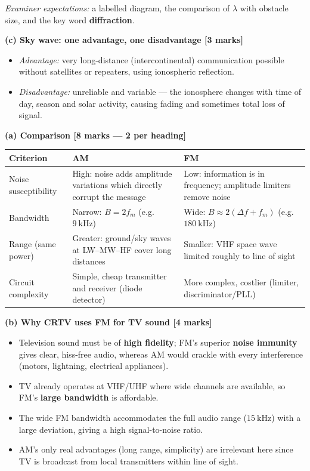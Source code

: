 \documentclass[11pt]{article}
\begin{document}
\begin{corrige}
\emph{Examiner expectations:} a labelled diagram, the comparison of $\lambda$ with obstacle size, and the key word \textbf{diffraction}.

\textbf{(c) Sky wave: one advantage, one disadvantage [3 marks]}
\begin{itemize}
\item \emph{Advantage:} very long-distance (intercontinental) communication possible without satellites or repeaters, using ionospheric reflection.
\item \emph{Disadvantage:} unreliable and variable — the ionosphere changes with time of day, season and solar activity, causing fading and sometimes total loss of signal.
\end{itemize}
\end{corrige}

\begin{corrige}
\textbf{(a) Comparison [8 marks — 2 per heading]}

\begin{center}
\begin{tabularx}{\linewidth}{|l|X|X|}
\hline
\rowcolor{popblueL} \textbf{Criterion} & \textbf{AM} & \textbf{FM} \\
\hline
Noise susceptibility & High: noise adds amplitude variations which directly corrupt the message & Low: information is in frequency; amplitude limiters remove noise \\
\hline
Bandwidth & Narrow: $B = 2f_m$ (e.g. $9\ \mathrm{kHz}$) & Wide: $B \approx 2(\Delta f + f_m)$ (e.g. $180\ \mathrm{kHz}$) \\
\hline
Range (same power) & Greater: ground/sky waves at LW--MW--HF cover long distances & Smaller: VHF space wave limited roughly to line of sight \\
\hline
Circuit complexity & Simple, cheap transmitter and receiver (diode detector) & More complex, costlier (limiter, discriminator/PLL) \\
\hline
\end{tabularx}
\end{center}

\textbf{(b) Why CRTV uses FM for TV sound [4 marks]}
\begin{itemize}
\item Television sound must be of \textbf{high fidelity}; FM's superior \textbf{noise immunity} gives clear, hiss-free audio, whereas AM would crackle with every interference (motors, lightning, electrical appliances).
\item TV already operates at VHF/UHF where wide channels are available, so FM's \textbf{large bandwidth} is affordable.
\item The wide FM bandwidth accommodates the full audio range ($15\ \mathrm{kHz}$) with a large deviation, giving a high signal-to-noise ratio.
\item AM's only real advantages (long range, simplicity) are irrelevant here since TV is broadcast from local transmitters within line of sight.
\end{itemize}


\end{corrige}
\end{document}
